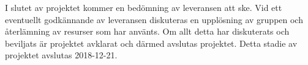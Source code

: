 \documentclass[projektplan/plan.tex]{subfiles}
\begin{document}
I slutet av projektet kommer en bedömning av leveransen att ske. Vid ett eventuellt
godkännande av leveransen diskuteras en upplösning av gruppen och återlämning av
resurser som har använts. Om allt detta har diskuterats och beviljats är
projektet avklarat och därmed avslutas projektet. Detta stadie av projektet
avslutas 2018-12-21.
\end{document}
